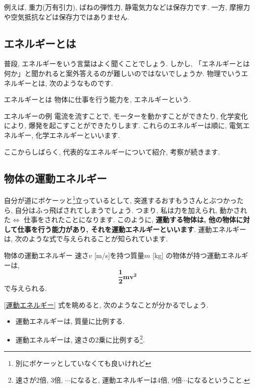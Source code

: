\documentclass[11pt,dvipdfmx]{jsarticle}
\numberwithin{equation}{section} %
\begin{document}
例えば, 重力(万有引力), ばねの弾性力, 静電気力などは保存力です. 一方, 摩擦力や空気抵抗などは保存力ではありません.
\subsection{エネルギーとは}
普段, エネルギーをいう言葉はよく聞くことでしょう. しかし, 「エネルギーとは何か」と聞かれると案外答えるのが難しいのではないでしょうか. 物理でいうエネルギーとは, 次のようなものです.
\begin{freebox}{エネルギーとは}
物体に仕事を行う能力を, エネルギーという.   
\end{freebox}
\begin{exbox}{エネルギーの例}
    電流を流すことで, モーターを動かすことができたり, 化学変化により, 爆発を起こすことができたりします. これらのエネルギーは順に, 電気エネルギー, 化学エネルギーといいます. 
\end{exbox}
ここからしばらく, 代表的なエネルギーについて紹介, 考察が続きます. 
\subsection{物体の運動エネルギー}
自分が道にボケーッと\footnote{別にボケーッとしていなくても良いけれど}立っているとして, 突進するおすもうさんとぶつかったら, 自分はふっ飛ばされてしまうでしょう. つまり, 私は力を加えられ, 動かされた$\Longleftrightarrow$ 仕事をされたことになります. このように, \textbf{運動する物体は, 他の物体に対して仕事を行う能力があり, それを運動エネルギーといいます}. 運動エネルギーは, 次のような式で与えられることが知られています. 
\begin{freebox}{物体の運動エネルギー}
    速さ$v$ [m/s]を持つ質量$m$ [kg] の物体が持つ運動エネルギーは, 
    \begin{equation}
        \bm{\frac{1}{2}mv^2} \label{運動エネルギー}
    \end{equation}
    で与えられる.
\end{freebox}
\eqref{運動エネルギー} 式を眺めると, 次のようなことが分かるでしょう.
\begin{itemize}
    \item 運動エネルギーは, 質量に比例する.
    \item 運動エネルギーは, 速さの2乗に比例する\footnote{速さが2倍, 3倍, $\cdots$になると, 運動エネルギーは4倍, 9倍$\cdots$になるということ.}.
\end{itemize}
 
\end{document}
